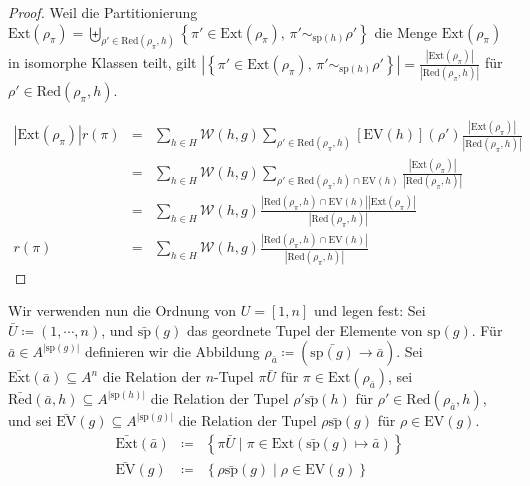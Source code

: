 \begin{proof}
Weil die Partitionierung $\mathrm{Ext}\left(\rho_{\pi}\right)=\biguplus_{\rho'\in\mathrm{Red}\left(\rho_{\pi},h\right)}\left\{ \pi'\in\mathrm{Ext}\left(\rho_{\pi}\right),\,\pi'\sim_{\mathrm{sp}\left(h\right)}\rho'\right\} $
die Menge $\mathrm{Ext}\left(\rho_{\pi}\right)$ in isomorphe Klassen
teilt, gilt $\left|\left\{ \pi'\in\mathrm{Ext}\left(\rho_{\pi}\right),\,\pi'\sim_{\mathrm{sp}\left(h\right)}\rho'\right\} \right|=\frac{\left|\mathrm{Ext}\left(\rho_{\pi}\right)\right|}{\left|\mathrm{Red}\left(\rho_{\pi},h\right)\right|}$
für $\rho'\in\mathrm{Red}\left(\rho_{\pi},h\right)$.

\begin{eqnarray*}
\left|\mathrm{Ext}\left(\rho_{\pi}\right)\right|r\left(\pi\right) & = & \sum_{h\in H}\mathcal{W}\left(h,g\right)\sum_{\rho'\in\mathrm{Red}\left(\rho_{\pi},h\right)}\left[\mathrm{EV}\left(h\right)\right]\left(\rho'\right)\frac{\left|\mathrm{Ext}\left(\rho_{\pi}\right)\right|}{\left|\mathrm{Red}\left(\rho_{\pi},h\right)\right|}\\
 & = & \sum_{h\in H}\mathcal{W}\left(h,g\right)\sum_{\rho'\in\mathrm{Red}\left(\rho_{\pi},h\right)\cap\mathrm{EV}\left(h\right)}\frac{\left|\mathrm{Ext}\left(\rho_{\pi}\right)\right|}{\left|\mathrm{Red}\left(\rho_{\pi},h\right)\right|}\\
 & = & \sum_{h\in H}\mathcal{W}\left(h,g\right)\frac{\left|\mathrm{Red}\left(\rho_{\pi},h\right)\cap\mathrm{EV}\left(h\right)\right|\left|\mathrm{Ext}\left(\rho_{\pi}\right)\right|}{\left|\mathrm{Red}\left(\rho_{\pi},h\right)\right|}\\
r\left(\pi\right) & = & \sum_{h\in H}\mathcal{W}\left(h,g\right)\frac{\left|\mathrm{Red}\left(\rho_{\pi},h\right)\cap\mathrm{EV}\left(h\right)\right|}{\left|\mathrm{Red}\left(\rho_{\pi},h\right)\right|}
\end{eqnarray*}
\end{proof}
Wir verwenden nun die Ordnung von $U=\left[1,n\right]$ und legen
fest: Sei $\bar{U}\coloneqq\left(1,\cdots,n\right)$, und $\bar{\mathrm{sp}}\left(g\right)$
das geordnete Tupel der Elemente von $\mathrm{sp}\left(g\right)$.
Für $\bar{a}\in A^{\left|\mathrm{sp}\left(g\right)\right|}$ definieren
wir die Abbildung $\rho_{\bar{a}}\coloneqq\left(\bar{\mathrm{sp}\left(g\right)}\rightarrow\bar{a}\right)$.
Sei $\bar{\mathrm{Ext}}\left(\bar{a}\right)\subseteq A^{n}$ die Relation
der $n$-Tupel $\pi\bar{U}$ für $\pi\in\mathrm{Ext}\left(\rho_{\bar{a}}\right)$,
sei $\bar{\mathrm{Red}}\left(\bar{a},h\right)\subseteq A^{\left|\mathrm{sp}\left(h\right)\right|}$
die Relation der Tupel $\rho'\bar{\mathrm{sp}}\left(h\right)$ für
$\rho'\in\mathrm{Red}\left(\rho_{\bar{a}},h\right)$, und sei $\bar{\mathrm{EV}}\left(g\right)\subseteq A^{\left|\mathrm{sp}\left(g\right)\right|}$
die Relation der Tupel $\rho\bar{\mathrm{sp}}\left(g\right)$ für
$\rho\in\mathrm{EV}\left(g\right)$. 
\begin{eqnarray*}
\bar{\mathrm{Ext}}\left(\bar{a}\right) & \coloneqq & \left\{ \pi\bar{U}\mid\pi\in\mathrm{Ext}\left(\bar{\mathrm{sp}}\left(g\right)\mapsto\bar{a}\right)\right\} \\
\bar{\mathrm{EV}}\left(g\right) & \coloneqq & \left\{ \rho\bar{\mathrm{sp}}\left(g\right)\mid\rho\in\mathrm{EV}\left(g\right)\right\} 
\end{eqnarray*}

